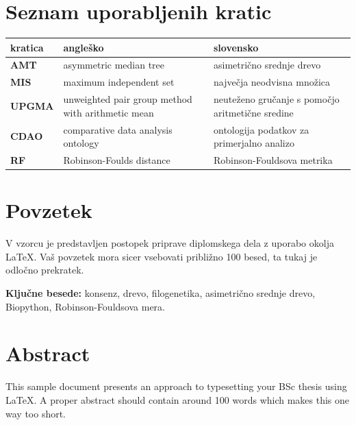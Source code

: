 \documentclass[a4paper, 12pt]{book}
\newcommand{\tkeywords}{konsenz, drevo, filogenetika, asimetrično srednje drevo, Biopython, Robinson-Fouldsova mera}
\newcommand{\clearemptydoublepage}{\newpage{\pagestyle{empty}\cleardoublepage}}
\begin{document}
\clearemptydoublepage

\def\thepage{}%
\setcounter{tocdepth}{3}
\tableofcontents{}


\clearemptydoublepage


\chapter*{Seznam uporabljenih kratic}

\begin{tabular}{l|p{6cm}|p{6cm}}
  {\bf kratica} & {\bf angleško} & {\bf slovensko} \\ \hline
  {\bf AMT} & asymmetric median tree & asimetrično srednje drevo \\
  {\bf MIS} & maximum independent set & največja neodvisna množica \\
  {\bf UPGMA} & unweighted pair group method with arithmetic mean & neuteženo gručanje s pomočjo aritmetične sredine \\
  {\bf CDAO} & comparative data analysis ontology  & ontologija podatkov za primerjalno analizo \\
  {\bf RF} & Robinson-Foulds distance & Robinson-Fouldsova metrika\\
\end{tabular}



\clearemptydoublepage

\chapter*{Povzetek}
V vzorcu je predstavljen postopek priprave diplomskega dela z uporabo okolja \LaTeX. 
Vaš povzetek mora sicer vsebovati približno 100 besed, ta tukaj je odločno prekratek.
\bigskip

\noindent\textbf{Ključne besede:} \tkeywords.
\clearemptydoublepage

\chapter*{Abstract}
This sample document presents an approach to typesetting your BSc thesis using \LaTeX. 
A proper abstract should contain around 100 words which makes this one way too short.
\bigskip
\end{document}
